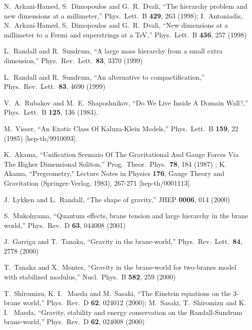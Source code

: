 \documentclass[a4paper,showpacs,preprintnumbers,amsmath,amssymb]{revtex4}
\begin{document}
\begin{thebibliography}{99}


N.~Arkani-Hamed, S.~Dimopoulos and G.~R.~Dvali,
 ``The hierarchy problem and new dimensions at a millimeter,''
Phys.\ Lett.\ B {\bf 429}, 263 (1998);
 I.~Antoniadis, N.~Arkani-Hamed, S.~Dimopoulos and G.~R.~Dvali,
 ``New dimensions at a millimeter to a Fermi and superstrings at a TeV,''
Phys.\ Lett.\ B {\bf 436}, 257 (1998)

 
L.~Randall and R.~Sundrum,
 ``A large mass hierarchy from a small extra dimension,''
Phys.\ Rev.\ Lett.\  {\bf 83}, 3370 (1999)
 

L.~Randall and R.~Sundrum,
 ``An alternative to compactification,''
Phys.\ Rev.\ Lett.\  {\bf 83}, 4690 (1999)


V.~A.~Rubakov and M.~E.~Shaposhnikov,
 ``Do We Live Inside A Domain Wall?,''
Phys.\ Lett.\ B {\bf 125}, 136 (1983).
 
 
M.~Visser,
 ``An Exotic Class Of Kaluza-Klein Models,''
Phys.\ Lett.\ B {\bf 159}, 22 (1985)
[hep-th/9910093].

 
K.~Akama,
 ``Unification Scenario Of The Gravitational And Gauge Forces Via The Higher Dimensional Soliton,''
Prog.\ Theor.\ Phys.\  {\bf 78}, 184 (1987) 
;
K. Akama, ``Pregeometry," Lecture Notes in Physics {\bf 176}, Gauge Theory and Gravitation (Springer-Verlag, 1983), 267-271 [hep-th/0001113].


 
 
J.~Lykken and L.~Randall,
 ``The shape of gravity,''
JHEP {\bf 0006}, 014 (2000)
 
S.~Mukohyama,
 ``Quantum effects, brane tension and large hierarchy in the brane world,''
Phys.\ Rev.\ D {\bf 63}, 044008 (2001)
 

J.~Garriga and T.~Tanaka,
 ``Gravity in the brane-world,''
Phys.\ Rev.\ Lett.\  {\bf 84}, 2778 (2000)

T.~Tanaka and X.~Montes,
 ``Gravity in the brane-world for two-branes model with stabilized  modulus,''
Nucl.\ Phys.\ B {\bf 582}, 259 (2000)
 

T.~Shiromizu, K. I. ~Maeda and M.~Sasaki,
 ``The Einstein equations on the 3-brane world,''
Phys.\ Rev.\ D {\bf 62}, 024012 (2000);
M.~Sasaki, T.~Shiromizu and K. I. ~Maeda,
 ``Gravity, stability and energy conservation on the Randall-Sundrum  brane-world,''
Phys.\ Rev.\ D {\bf 62}, 024008 (2000)



\end{thebibliography}
\end{document}
